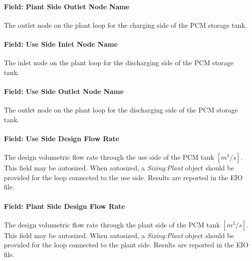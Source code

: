 \paragraph{Field: Plant Side Outlet Node Name}\label{field-pcmstorage-plant-side-outlet-node-name}

The outlet node on the plant loop for the charging side of the PCM storage tank.

\paragraph{Field: Use Side Inlet Node Name}\label{field-pcmstorage-use-side-inlet-node-name}

The inlet node on the plant loop for the discharging side of the PCM storage tank.

\paragraph{Field: Use Side Outlet Node Name}\label{field-pcmstorage-use-side-outlet-node-name}

The outlet node on the plant loop for the discharging side of the PCM storage tank.

\paragraph{Field: Use Side Design Flow Rate}\label{field-pcmstorage-use-side-design-flow-rate}

The design volumetric flow rate through the use side of the PCM tank \([m^3/s]\).  This field may be autosized.  When autosized, a \emph{Sizing:Plant} object should be provided for the loop connected to the use side.  Results are reported in the EIO file.

\paragraph{Field: Plant Side Design Flow Rate}\label{field-pcmstorage-plant-side-design-flow-rate}

The design volumetric flow rate through the plant side of the PCM tank \([m^3/s]\).  This field may be autosized.  When autosized, a \emph{Sizing:Plant} object should be provided for the loop connected to the plant side.  Results are reported in the EIO file.

